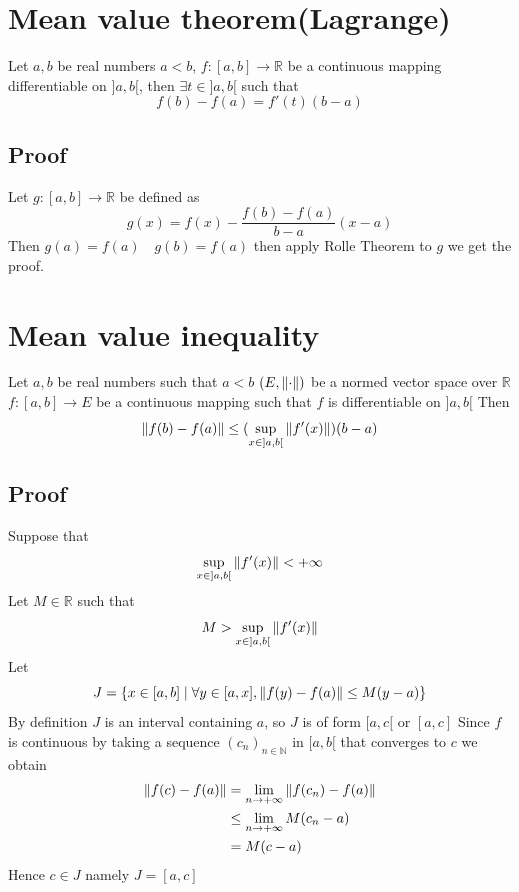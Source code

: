 \documentclass{book}
\begin{document}
\section{Mean value theorem(Lagrange)}
Let $a,b$ be real numbers $a<b$, $f:[a,b]\rightarrow\mathbb{R}$ be a continuous mapping differentiable on ${]a,b[}$, then $\exists t\in {]a,b[}$ such that $$f(b)-f(a)=f'(t)(b-a)$$
\subsection*{Proof}
Let $g:[a,b]\rightarrow\mathbb{R}$ be defined as $$g(x)=f(x)-\frac{f(b)-f(a)}{b-a}(x-a) $$ Then $g(a)=f(a)\quad g(b)=f(a)$ then apply Rolle Theorem to $g$ we get the proof.
\section{Mean value inequality}
Let $a,b$ be real numbers such that $a<b$ $(E,\left\lVert \cdot \right\rVert)$ be a normed vector space over $\mathbb{R}$ $f:[a,b]\rightarrow E$ be a continuous mapping such that $f$ is differentiable on ${]a,b[}$ Then $$
\left\lVert f(b)-f(a) \right\rVert\leq(\sup\limits_{x\in {]a,b[}}\left\lVert f'(x) \right\rVert)(b-a)$$
\subsection*{Proof}
Suppose that $$\sup\limits_{x\in {]a,b[}}\left\lVert f'(x) \right\rVert<+\infty$$
Let $M\in \mathbb{R}$ such that $$M>\sup\limits_{x\in {]a,b[}}\left\lVert f'(x) \right\rVert$$
Let $$J=\{x\in [a,b]\mid\forall y\in [a,x],\left\lVert f(y)-f(a) \right\rVert\leq M(y-a)\}$$
By definition $J$ is an interval containing $a$, so $J$ is of form ${[a,c[}$ or ${[a,c]}$
Since $f$ is continuous by taking a sequence $(c_n)_{n\in \mathbb{N}}$ in ${[a,b[}$ that converges to $c$ we obtain $$\begin{aligned}
    \left\lVert f(c)-f(a) \right\rVert &=\lim\limits_{n\rightarrow+\infty}\left\lVert f(c_n)-f(a) \right\rVert\\
    &\leq \lim\limits_{n\rightarrow +\infty}M(c_n-a)\\
    &= M(c-a)
\end{aligned}$$
Hence $c\in J$ namely $J=[a,c]$
\end{document}
